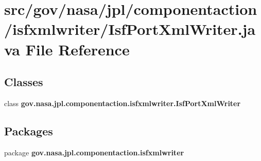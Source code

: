 \section{src/gov/nasa/jpl/componentaction/isfxmlwriter/\+Isf\+Port\+Xml\+Writer.java File Reference}
\label{_isf_port_xml_writer_8java}
\subsection*{Classes}
\begin{DoxyCompactItemize}
\item 
class {\bf gov.\+nasa.\+jpl.\+componentaction.\+isfxmlwriter.\+Isf\+Port\+Xml\+Writer}
\end{DoxyCompactItemize}
\subsection*{Packages}
\begin{DoxyCompactItemize}
\item 
package {\bf gov.\+nasa.\+jpl.\+componentaction.\+isfxmlwriter}
\end{DoxyCompactItemize}
